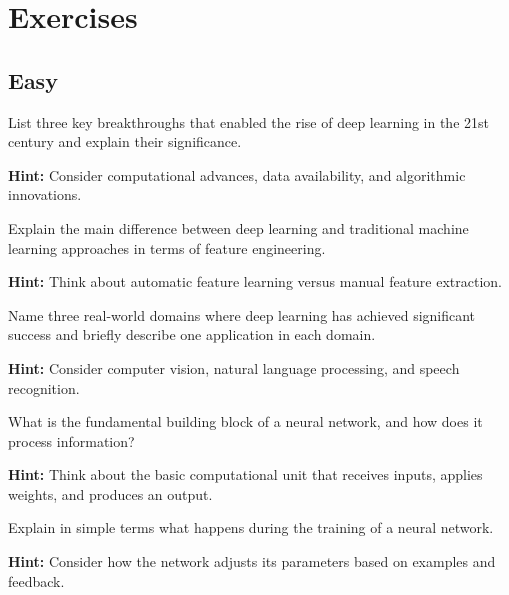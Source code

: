 
\section*{Exercises}

\subsection*{Easy}

\begin{problem}
List three key breakthroughs that enabled the rise of deep learning in the 21st century and explain their significance.

\textbf{Hint:} Consider computational advances, data availability, and algorithmic innovations.
\end{problem}

\begin{problem}
Explain the main difference between deep learning and traditional machine learning approaches in terms of feature engineering.

\textbf{Hint:} Think about automatic feature learning versus manual feature extraction.
\end{problem}

\begin{problem}
Name three real-world domains where deep learning has achieved significant success and briefly describe one application in each domain.

\textbf{Hint:} Consider computer vision, natural language processing, and speech recognition.
\end{problem}

\begin{problem}
What is the fundamental building block of a neural network, and how does it process information?

\textbf{Hint:} Think about the basic computational unit that receives inputs, applies weights, and produces an output.
\end{problem}

\begin{problem}
Explain in simple terms what happens during the training of a neural network.

\textbf{Hint:} Consider how the network adjusts its parameters based on examples and feedback.
\end{problem}

